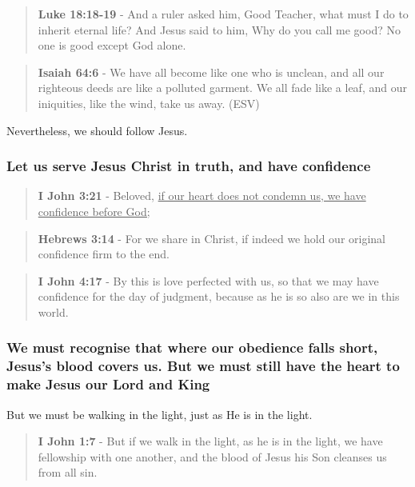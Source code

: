 \documentclass[11pt]{article}
\begin{document}
\begin{quote}
\textbf{Luke 18:18-19} - And a ruler asked him, Good Teacher, what must I do to inherit eternal life? And Jesus said to him, Why do you call me good? No one is good except God alone.
\end{quote}

\begin{quote}
\textbf{Isaiah 64:6} - We have all become like one who is unclean, and all our righteous deeds are like a polluted garment. We all fade like a leaf, and our iniquities, like the wind, take us away. (ESV)
\end{quote}

Nevertheless, we should follow Jesus.

\subsubsection{Let us serve Jesus Christ in truth, and have confidence}
\label{sec:org6b10db0}

\begin{quote}
\textbf{I John 3:21} - Beloved, \uline{if our heart does not condemn us, we have confidence before God;}
\end{quote}

\begin{quote}
\textbf{Hebrews 3:14} - For we share in Christ, if indeed we hold our original confidence firm to the end.
\end{quote}

\begin{quote}
\textbf{I John 4:17} - By this is love perfected with us, so that we may have confidence for the day of judgment, because as he is so also are we in this world.
\end{quote}

\subsubsection{We must recognise that where our obedience falls short, Jesus's blood covers us. But we must still have the heart to make Jesus our Lord and King}
\label{sec:orgd23c3d6}
But we must be walking in the light, just as He is in the light.

\begin{quote}
\textbf{I John 1:7} - But if we walk in the light, as he is in the light, we have fellowship with one another, and the blood of Jesus his Son cleanses us from all sin.
\end{quote}
\end{document}
